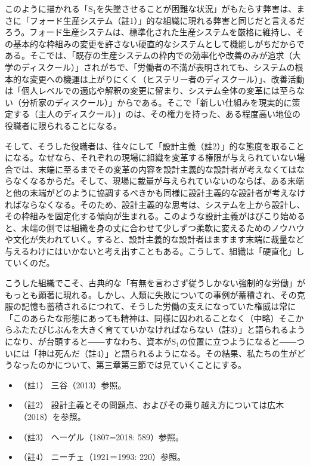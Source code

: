 このように描かれる「\(\textrm{S}_1\)を失墜させることが困難な状況」がもたらす弊害は、まさに「フォード生産システム（註1）」的な組織に現れる弊害と同じだと言えるだろう。フォード生産システムは、標準化された生産システムを厳格に維持し、その基本的な枠組みの変更を許さない硬直的なシステムとして機能しがちだからである。そこでは、「既存の生産システムの枠内での効率化や改善のみが追求（\mbox{大学のディスクール}）」されがちで、「労働者の不満が表明されても、システムの根本的な変更への機運は上がりにくく（\mbox{ヒステリー者のディスクール}）」、改善活動は「個人レベルでの適応や解釈の変更に留まり、システム全体の変革には至らない（\mbox{分析家のディスクール}）」からである。そこで「新しい仕組みを現実的に策定する（\mbox{主人のディスクール}）」のは、その権力を持った、ある程度高い地位の役職者に限られることになる。

そして、そうした役職者は、往々にして「設計主義（註2）」的な態度を取ることになる。なぜなら、それぞれの現場に組織を変革する権限が与えられていない場合では、末端に至るまでその変革の内容を設計主義的な設計者が考えなくてはならなくなるからだ。そして、現場に裁量が与えられていないのならば、ある末端と他の末端がどのように協調するべきかも同様に設計主義的な設計者が考えなければならなくなる。そのため、設計主義的な思考は、システムを上から設計し、その枠組みを固定化する傾向が生まれる。このような設計主義がはびこり始めると、末端の側では組織を身の丈に合わせて少しずつ柔軟に変えるためのノウハウや文化が失われていく。すると、設計主義的な設計者はますます末端に裁量など与えるわけにはいかないと考え出すこともある。こうして、組織は「硬直化」していくのだ。

こうした組織でこそ、古典的な「有無を言わさず従うしかない強制的な労働」がもっとも顕著に現れる。しかし、人類に失敗についての事例が蓄積され、その克服の記憶も蓄積されるにつれて、そうした労働の支えになっていた権威は常に「このあらたな形態にあっても精神は、同様に囚われることなく（中略）そこからふたたびじぶんを大きく育てていかなければならない（註3）」と語られるようになり、が台頭すると――すなわち、資本が\(\textrm{S}_1\)の位置に立つようになると――ついには「神は死んだ（註4）」と語られるようになる。その結果、私たちの生がどうなったのかについて、第三章第三節では見ていくことにする。

\begin{itemize}
\tightlist
\item
  （註1） 三谷（2013）\cite{Mitani}参照。
\item
  （註2）
  設計主義とその問題点、およびその乗り越え方については広木（2018）\cite{Hiroki}を参照。
\item
  （註3） ヘーゲル（1807=2018: 589）\cite{Hegel2}参照。
\item
  （註4） ニーチェ（1921＝1993: 220）\cite{Nietzsche3}参照。
\end{itemize}

